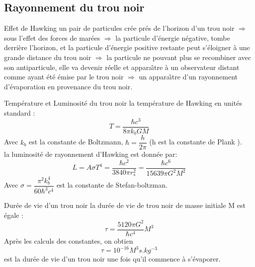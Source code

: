 \documentclass{beamer}
\begin{document}
\subsection{Rayonnement du trou noir}
\begin{frame}
\begin{block}{Effet de Hawking}
un pair de particules crée prés de l'horizon d'un trou noir $\Rightarrow$ sous l'effet des forces de marées $\Rightarrow$ la particule d'énergie négative, tombe derrière l'horizon, et
la particule d'énergie positive restante peut s'éloigner à une grande distance du trou noir $\Rightarrow$ la particule ne pouvant plus se recombiner avec son antiparticule, elle va devenir réelle et appara\^{\i}tre à un observateur distant comme ayant été émise par le trou noir $\Rightarrow$ un appara\^{\i}tre d'un rayonnement d'évaporation en provenance du trou noir.
\end{block}
\end{frame}

\begin{frame}
\begin{block}{Température et Luminosité du trou noir}
	la température de Hawking en unités standard :
	$$T=\dfrac{\hbar c^{3}}{8\pi k_{b}GM}$$
	Avec $k_{b}$ est la constante de Boltzmann, $\hbar = \dfrac{h}{2\pi}$ (h
	est la constante de Plank ).\\
	
	la luminosité de rayonnement d'Hawking est donnée par:
	$$L=A\sigma T^{4}=\dfrac{\hbar c^{2}}{3840\pi r_{s}^{2}}=\dfrac{\hbar c^{6}}{15639\pi G^{2}M^{2}}$$
	Avec $\sigma = \dfrac{\pi^{2}k_{b}^{4}}{60\hbar^{3}c^{4}}$  est la constante de Stefan-boltzman.
\end{block}
\end{frame}
\begin{frame}
\begin{block}{Durée de vie d'un trou noir}
	la durée de vie de trou noir de masse initiale M est égale :
	$$\tau=\dfrac{5120\pi G^{2}}{\hbar c^{4}}M^{3}$$
	Après les calculs des constantes, on obtien
    $$\tau = 10^{-16}M^{3}s.kg^{-3}$$
    est la durée de vie d'un trou noir une fois qu'il commence à s'évaporer.
\end{block}
\end{frame}
\end{document}
